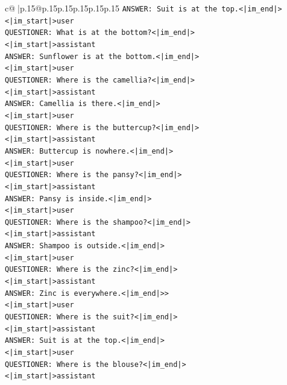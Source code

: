 \documentclass{article}
\begin{document}
{\begin{supertabular}{c@{$\;$}|p{.15\linewidth}@{}p{.15\linewidth}p{.15\linewidth}p{.15\linewidth}p{.15\linewidth}p{.15\linewidth}}
{{{\texttt{ANSWER: Suit is at the top.<|im\_end|>} \\
\texttt{<|im\_start|>user} \\
\texttt{QUESTIONER: What is at the bottom?<|im\_end|>} \\
\texttt{<|im\_start|>assistant} \\
\texttt{ANSWER: Sunflower is at the bottom.<|im\_end|>} \\
\texttt{<|im\_start|>user} \\
\texttt{QUESTIONER: Where is the camellia?<|im\_end|>} \\
\texttt{<|im\_start|>assistant} \\
\texttt{ANSWER: Camellia is there.<|im\_end|>} \\
\texttt{<|im\_start|>user} \\
\texttt{QUESTIONER: Where is the buttercup?<|im\_end|>} \\
\texttt{<|im\_start|>assistant} \\
\texttt{ANSWER: Buttercup is nowhere.<|im\_end|>} \\
\texttt{<|im\_start|>user} \\
\texttt{QUESTIONER: Where is the pansy?<|im\_end|>} \\
\texttt{<|im\_start|>assistant} \\
\texttt{ANSWER: Pansy is inside.<|im\_end|>} \\
\texttt{<|im\_start|>user} \\
\texttt{QUESTIONER: Where is the shampoo?<|im\_end|>} \\
\texttt{<|im\_start|>assistant} \\
\texttt{ANSWER: Shampoo is outside.<|im\_end|>} \\
\texttt{<|im\_start|>user} \\
\texttt{QUESTIONER: Where is the zinc?<|im\_end|>} \\
\texttt{<|im\_start|>assistant} \\
\texttt{ANSWER: Zinc is everywhere.<|im\_end|>>} \\
\texttt{<|im\_start|>user} \\
\texttt{QUESTIONER: Where is the suit?<|im\_end|>} \\
\texttt{<|im\_start|>assistant} \\
\texttt{ANSWER: Suit is at the top.<|im\_end|>} \\
\texttt{<|im\_start|>user} \\
\texttt{QUESTIONER: Where is the blouse?<|im\_end|>} \\
\texttt{<|im\_start|>assistant} \\
}}}
\end{supertabular}}
\end{document}
